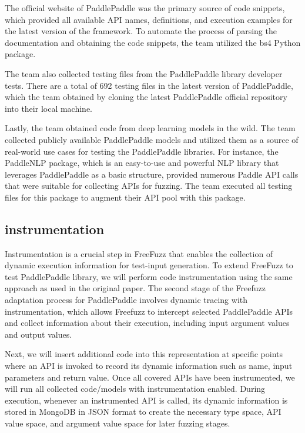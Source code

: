 \documentclass[sigconf]{acmart}
\begin{document}
  The official website of PaddlePaddle was the primary source of code snippets, which provided all available API names, 
  definitions, and execution examples for the latest version of the framework. To automate the process of parsing the documentation and obtaining the code snippets, 
  the team utilized the bs4 Python package. 

  The team also collected testing files from the PaddlePaddle library developer tests. 
  There are a total of 692 testing files in the latest version of PaddlePaddle, which the team obtained by cloning the latest PaddlePaddle official repository into their local machine.

  Lastly, the team obtained code from deep learning models in the wild. 
  The team collected publicly available PaddlePaddle models and utilized them as a source of real-world use cases for testing the PaddlePaddle libraries. 
  For instance, the PaddleNLP package, which is an easy-to-use and powerful NLP library that leverages PaddlePaddle as a basic structure, provided numerous Paddle API calls that were suitable for collecting APIs for fuzzing. 
  The team executed all testing files for this package to augment their API pool with this package.
    
  \subsection{instrumentation}
  

  Instrumentation is a crucial step in FreeFuzz that enables the collection of dynamic execution information for test-input generation. 
  To extend FreeFuzz to test PaddlePaddle library, we will perform code instrumentation using the same approach as used in the original paper.
  The second stage of the Freefuzz adaptation process for PaddlePaddle involves dynamic tracing with instrumentation, 
  which allows Freefuzz to intercept selected PaddlePaddle APIs and collect information about their execution, 
  including input argument values and output values. 

  Next, we will insert additional code into this representation at specific points where an API is invoked to record its dynamic information such as name, input parameters and return value.
  Once all covered APIs have been instrumented, we will run all collected code/models with instrumentation enabled. 
  During execution, whenever an instrumented API is called, its dynamic information is stored in MongoDB in JSON format to create the necessary type space, 
  API value space, and argument value space for later fuzzing stages.
\end{document}
